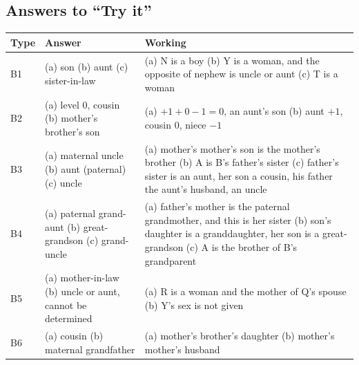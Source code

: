 \documentclass[11pt,a4paper]{article}
\let\oldsubsection\subsection
\renewcommand{\subsection}{\needspace{9\baselineskip}\oldsubsection}
\begin{document}
\subsection*{Answers to ``Try it''}
\begin{center}\small\renewcommand{\arraystretch}{1.2}\setlength{\tabcolsep}{8pt}
\begin{tabularx}{\linewidth}{@{}l>{\raggedright\arraybackslash}X>{\raggedright\arraybackslash}X@{}}
\toprule
\textbf{\color{slate}Type} & \textbf{\color{slate}Answer} & \textbf{\color{slate}Working} \\ \midrule
B1 & (a) son \newline (b) aunt \newline (c) sister-in-law & (a) N is a boy \newline (b) Y is a woman, and the opposite of nephew is uncle or aunt \newline (c) T is a woman \\
B2 & (a) level 0, cousin \newline (b) mother's brother's son & (a) $+1 + 0 - 1 = 0$, an aunt's son \newline (b) aunt $+1$, cousin $0$, niece $-1$ \\
B3 & (a) maternal uncle \newline (b) aunt (paternal) \newline (c) uncle & (a) mother's mother's son is the mother's brother \newline (b) A is B's father's sister \newline (c) father's sister is an aunt, her son a cousin, his father the aunt's husband, an uncle \\
B4 & (a) paternal grand-aunt \newline (b) great-grandson \newline (c) grand-uncle & (a) father's mother is the paternal grandmother, and this is her sister \newline (b) son's daughter is a granddaughter, her son is a great-grandson \newline (c) A is the brother of B's grandparent \\
B5 & (a) mother-in-law \newline (b) uncle or aunt, cannot be determined & (a) R is a woman and the mother of Q's spouse \newline (b) Y's sex is not given \\
B6 & (a) cousin \newline (b) maternal grandfather & (a) mother's brother's daughter \newline (b) mother's mother's husband \\

\end{tabularx}
\end{center}
\end{document}
